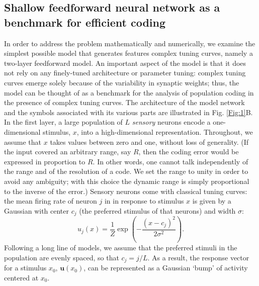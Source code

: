 \documentclass[a4paper]{article}%
\begin{document}
\subsection{Shallow feedforward neural network as a benchmark for efficient
coding}
In order to address the problem mathematically and numerically, we examine the
simplest possible model that generates features complex tuning curves, namely
a two-layer feedforward model. An important aspect of the model is that it
does not rely on any finely-tuned architecture or parameter tuning: complex
tuning curves emerge solely because of the variability in synaptic weights;
thus, the model can be thought of as a benchmark for the analysis of
population coding in the presence of complex tuning curves. The architecture
of the model network and the symbols associated with its various parts are
illustrated in Fig. \ref{Fig:1}B. In the first layer, a large population of
$L$ \textit{sensory} neurons encode a one-dimensional stimulus, $x$, into a
high-dimensional representation. Throughout, we assume that $x$ takes values
between zero and one, without loss of generality. (If the input covered an
arbitrary range, say $R$, then the coding error would be expressed in
proportion to $R$. In other words, one cannot talk independently of the range
and of the resolution of a code. We set the range to unity in order to avoid
any ambiguity; with this choice the dynamic range  is simply proportional to the inverse of the error.) Sensory neurons come with classical tuning curves: the mean
firing rate of neuron $j$ in in response to stimulus $x$ is given by a
Gaussian with center $c_{j}$ (the preferred stimulus of that neurons) and
width $\sigma$:
\begin{equation}
u_{j}\left(  x\right)  =\frac{1}{Z}\exp\left(  -\frac{\left(  x-c_{j}\right)
^{2}}{2\sigma^{2}}\right)  .
\label{tuning-curve-layer1}
\end{equation}
Following a long line of models, we assume that the preferred stimuli in the
population are evenly spaced, so that $c_{j}=j/L$. As a result, the response
vector for a stimulus $x_{0}$, $\mathbf{u}\left(  x_{0}\right)  $, can be
represented as a Gaussian `bump' of activity centered at $x_{0}$.
\end{document}
